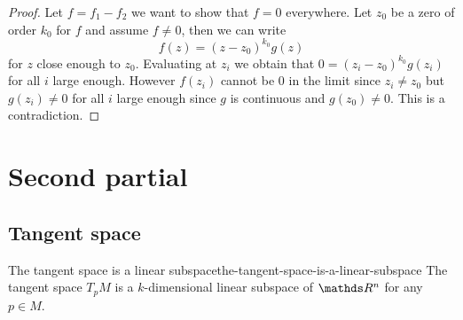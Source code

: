 \documentclass[12pt]{extarticle}
\numberwithin{equation}{subsection}
\begin{document}
\begin{proof}
	Let $f = f_1 - f_2$ we want to show that $f = 0$ everywhere.
	Let $z_0$ be a zero of order $k_0$ for $f$ and assume $f \neq 0$, then we can write
	\begin{equation}
		f(z) = (z - z_0)^{k_0} g(z)
	\end{equation}
	for $z$ close enough to $z_0$.
	Evaluating at $z_i$ we obtain that $0 = (z_i - z_0)^{k_0} g(z_i)$ for all $i$ large enough.
	However $f(z_i)$ cannot be $0$ in the limit since $z_i \neq z_0$ but $g(z_i) \neq 0$ for all $i$
	large enough since $g$ is continuous and $g(z_0) \neq 0$.
	This is a contradiction.
\end{proof}

\section{Second partial}

\subsection{Tangent space}

\begin{theorem}{The tangent space is a linear subspace}{the-tangent-space-is-a-linear-subspace}
	The tangent space $T_p M$ is a $k$-dimensional linear subspace of $\R^n$ for any $p \in M$.
\end{theorem}
\end{document}
